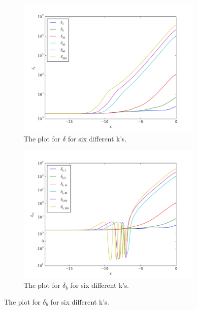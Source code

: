 \documentclass[a4paper]{report}
\begin{document}
\begin{figure}[ht]
\begin{subfigure}{.5\textwidth}
  \includegraphics[width=\textwidth]{delta.png}
 \caption{The plot for $\delta$ for six different k's.}
 \label{fig:delta}
\end{subfigure}
\begin{subfigure}{.5\textwidth}
\includegraphics[width=\textwidth]{deltab.png}
 \caption{The plot for $\delta_b$ for six different k's.}
 \label{fig:deltab}
\end{subfigure}

\end{figure}
\end{document}
